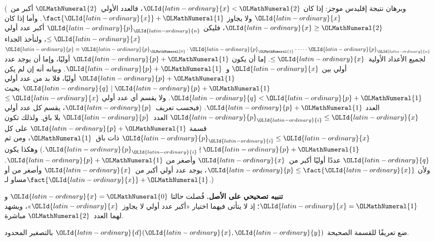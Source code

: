 \documentclass[../../../include/open-logic-section]{subfiles}
\begin{document}
(وبرهان نتيجة إقليدس موجز: إذا كان ${\OLId{latin-ordinary}{x}}<{\OLMathNumeral{2}}$، فالعدد الأولي~${\OLMathNumeral{2}}$ أكبر
من~${\OLId{latin-ordinary}{x}}$ ولا يجاوز $\fact{{\OLId{latin-ordinary}{x}}}+{\OLMathNumeral{1}}$. وأما إذا كان ${\OLId{latin-ordinary}{x}}\geq{\OLMathNumeral{2}}$، فليكن ${\OLId{latin-ordinary}{p}}_{\OLId{latin-ordinary}{n}}$
أكبر عدد أولي $\le {\OLId{latin-ordinary}{x}}$، ولنأخذ الجداء
${\OLId{latin-ordinary}{p}}={\OLId{latin-ordinary}{p}}_{\OLMathNumeral{0}}\cdot {\OLId{latin-ordinary}{p}}_{\OLMathNumeral{1}}\cdot\dots\cdot {\OLId{latin-ordinary}{p}}_{\OLId{latin-ordinary}{n}}$ لجميع الأعداد الأولية~$\le {\OLId{latin-ordinary}{x}}$.
إما أن يكون ${\OLId{latin-ordinary}{p}}+{\OLMathNumeral{1}}$ أوليًا، وإما أن يوجد عدد أولي بين ${\OLId{latin-ordinary}{x}}$ و~${\OLId{latin-ordinary}{p}}+{\OLMathNumeral{1}}$.
وبيانه أنه إن لم يكن ${\OLId{latin-ordinary}{p}}+{\OLMathNumeral{1}}$ أوليًا، فلا بد من عدد أولي ${\OLId{latin-ordinary}{q}}\mid {\OLId{latin-ordinary}{p}}+{\OLMathNumeral{1}}$
بحيث ${\OLId{latin-ordinary}{q}}<{\OLId{latin-ordinary}{p}}+{\OLMathNumeral{1}}$. ولا يقسم أي عدد أولي $\le {\OLId{latin-ordinary}{x}}$ العدد ${\OLId{latin-ordinary}{p}}+{\OLMathNumeral{1}}$. (فبحسب
تعريف~${\OLId{latin-ordinary}{p}}$، يقسم كل عدد أولي ${\OLId{latin-ordinary}{p}}_{\OLId{latin-ordinary}{i}}\le {\OLId{latin-ordinary}{x}}$ العدد~${\OLId{latin-ordinary}{p}}$ بلا باق. ولذلك تكون
قسمة ${\OLId{latin-ordinary}{p}}+{\OLMathNumeral{1}}$ على كل ${\OLId{latin-ordinary}{p}}_{\OLId{latin-ordinary}{i}}\le {\OLId{latin-ordinary}{x}}$ ذات باق~${\OLMathNumeral{1}}$، ومن ثم
${\OLId{latin-ordinary}{p}}_{\OLId{latin-ordinary}{i}}\nmid {\OLId{latin-ordinary}{p}}+{\OLMathNumeral{1}}$.) وهكذا يكون ${\OLId{latin-ordinary}{q}}$ عددًا أوليًا أكبر من~${\OLId{latin-ordinary}{x}}$ وأصغر من
${\OLId{latin-ordinary}{p}}+{\OLMathNumeral{1}}$. ولأن ${\OLId{latin-ordinary}{p}}\le\fact{{\OLId{latin-ordinary}{x}}}$، يوجد عدد أولي أكبر من~${\OLId{latin-ordinary}{x}}$ وأصغر من أو
مساو لـ$\fact{{\OLId{latin-ordinary}{x}}}+{\OLMathNumeral{1}}$.)

\textbf{تنبيه تصحيحي على الأصل.} فُصلت حالتا ${\OLId{latin-ordinary}{x}}={\OLMathNumeral{0}}$ و${\OLId{latin-ordinary}{x}}={\OLMathNumeral{1}}$؛ إذ لا
يتأتى فيهما اختيار «أكبر عدد أولي لا يجاوز~${\OLId{latin-ordinary}{x}}$»، ويشهد لهما العدد~${\OLMathNumeral{2}}$
مباشرة.

\begin{prob}
ضع تعريفًا للقسمة الصحيحة ${\OLId{latin-ordinary}{d}}({\OLId{latin-ordinary}{x}},{\OLId{latin-ordinary}{y}})$ بالتصغير المحدود.
\end{prob}
\end{document}
